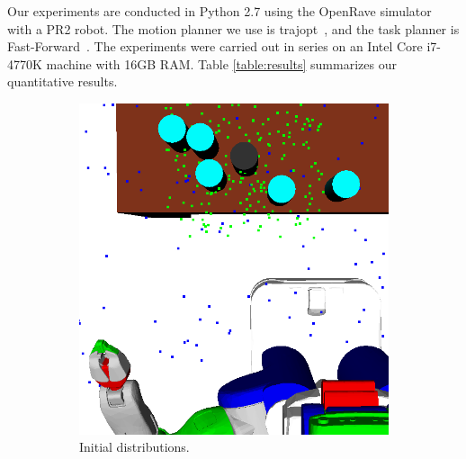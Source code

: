 Our experiments are conducted in Python 2.7 using the OpenRave simulator~\cite{Diankov_2008_6117} with a PR2 robot.
The motion planner we use is trajopt~\cite{schulman2013finding}, and the task planner is Fast-Forward~\cite{FF}.
The experiments were carried out in series on an Intel Core i7-4770K machine with 16GB RAM.
Table \ref{table:results} summarizes our quantitative results.

\begin{figure}[t]
  \centering
  \begin{subfigure}[b]{0.35\linewidth}
    \includegraphics[width=\textwidth]{images/learns.png}
    \caption{Initial distributions.}
  \end{subfigure}
  \begin{subfigure}[b]{0.35\linewidth}

\end{subfigure}
\end{figure}
